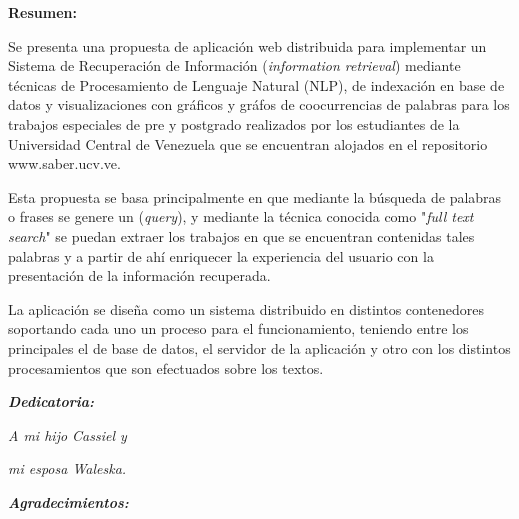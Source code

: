 \documentclass[
  10,
  openany]{book}
\begin{document}
\newpage
\thispagestyle{empty}
\large{\textbf{Resumen:}}

Se presenta una propuesta de aplicación web distribuida para implementar un Sistema de Recuperación de Información (\emph{information retrieval}) mediante técnicas de Procesamiento de Lenguaje Natural (NLP), de indexación en base de datos y visualizaciones con gráficos y gráfos de coocurrencias de palabras para los trabajos especiales de pre y postgrado realizados por los estudiantes de la Universidad Central de Venezuela que se encuentran alojados en el repositorio www.saber.ucv.ve.

Esta propuesta se basa principalmente en que mediante la búsqueda de palabras o frases se genere un (\emph{query}), y mediante la técnica conocida como "\emph{full text search}" se puedan extraer los trabajos en que se encuentran contenidas tales palabras y a partir de ahí enriquecer la experiencia del usuario con la presentación de la información recuperada.

La aplicación se diseña como un sistema distribuido en distintos contenedores soportando cada uno un proceso para el funcionamiento, teniendo entre los principales el de base de datos, el servidor de la aplicación y otro con los distintos procesamientos que son efectuados sobre los textos.

\thispagestyle{empty}




\setlength{\abovedisplayskip}{-5pt}
\setlength{\abovedisplayshortskip}{-5pt}
\thispagestyle{empty}

\newpage
\begin{center}
\large{\textbf{\emph{\Huge{Dedicatoria:}}}}
\end{center}
\thispagestyle{empty}
\vspace*{5cm}
\thispagestyle{empty}
\begin{center} \Large \emph{A  mi hijo Cassiel y  } \end{center}
\vspace*{1cm}
\begin{center} \Large \emph{mi esposa Waleska.} \end{center}



\newpage
\begin{center}
\large{\textbf{\emph{\Huge{Agradecimientos:}}}}
\end{center}
\thispagestyle{empty}
\vspace*{2cm}
\thispagestyle{empty}
\end{document}
